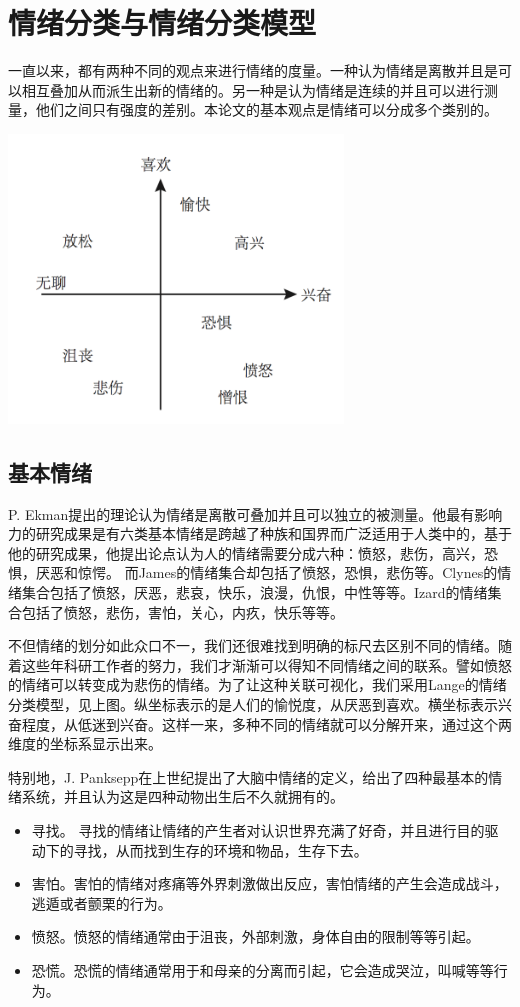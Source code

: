 \section{情绪分类与情绪分类模型}
	一直以来，都有两种不同的观点来进行情绪的度量。一种认为情绪是离散并且是可以相互叠加从而派生出新的情绪的。另一种是认为情绪是连续的并且可以进行测量，他们之间只有强度的差别。本论文的基本观点是情绪可以分成多个类别的。
	\centerline{\includegraphics[width=3.5in]{figure/emotion.png}}
	 \subsection{基本情绪}
	 P. Ekman提出的理论认为情绪是离散可叠加并且可以独立的被测量。他最有影响力的研究成果是有六类基本情绪是跨越了种族和国界而广泛适用于人类中的，基于他的研究成果，他提出论点认为人的情绪需要分成六种：愤怒，悲伤，高兴，恐惧，厌恶和惊愕。 而James的情绪集合却包括了愤怒，恐惧，悲伤等。Clynes的情绪集合包括了愤怒，厌恶，悲哀，快乐，浪漫，仇恨，中性等等。Izard的情绪集合包括了愤怒，悲伤，害怕，关心，内疚，快乐等等。
	 
	 不但情绪的划分如此众口不一，我们还很难找到明确的标尺去区别不同的情绪。随着这些年科研工作者的努力，我们才渐渐可以得知不同情绪之间的联系。譬如愤怒的情绪可以转变成为悲伤的情绪。为了让这种关联可视化，我们采用Lange的情绪分类模型，见上图。纵坐标表示的是人们的愉悦度，从厌恶到喜欢。横坐标表示兴奋程度，从低迷到兴奋。这样一来，多种不同的情绪就可以分解开来，通过这个两维度的坐标系显示出来。
	 
	 特别地，J. Panksepp在上世纪提出了大脑中情绪的定义，给出了四种最基本的情绪系统，并且认为这是四种动物出生后不久就拥有的。
	 \begin{itemize}
	 	\item 寻找。 寻找的情绪让情绪的产生者对认识世界充满了好奇，并且进行目的驱动下的寻找，从而找到生存的环境和物品，生存下去。
		\item 害怕。害怕的情绪对疼痛等外界刺激做出反应，害怕情绪的产生会造成战斗，逃遁或者颤栗的行为。
		\item 愤怒。愤怒的情绪通常由于沮丧，外部刺激，身体自由的限制等等引起。
		\item 恐慌。恐慌的情绪通常用于和母亲的分离而引起，它会造成哭泣，叫喊等等行为。
	 \end{itemize}

